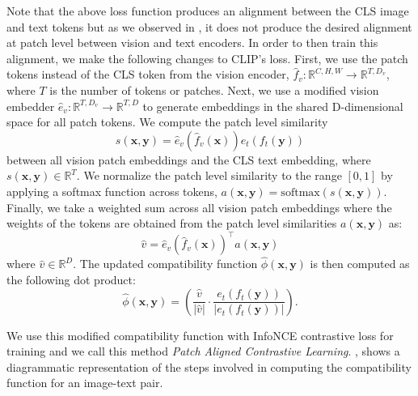 \documentclass[10pt,twocolumn,letterpaper]{article}
\begin{document}
Note that the above loss function produces an alignment between the CLS image and text tokens but as we observed in , it does not produce the desired alignment at patch level between vision and text encoders. In order to then train this alignment, we make the following changes to CLIP's loss. First, we use the patch tokens instead of the CLS token from the vision encoder, $\hat{f}_v: \mathbb{R}^{C, H, W} \rightarrow \mathbb{R}^{T, D_v}$, where $T$ is the number of tokens or patches. Next, we use a modified vision embedder $\hat{e}_v: \mathbb{R}^{T, D_v} \rightarrow \mathbb{R}^{T, D}$ to generate embeddings in the shared D-dimensional space for all patch tokens. We compute the patch level similarity
\begin{equation}
\label{eq:patch_similarity}
    s(\mathbf{x}, \mathbf{y}) = \hat{e}_v(\hat{f}_v(\mathbf{x}))e_t(f_t(\mathbf{y}))
\end{equation}
between all vision patch embeddings and the CLS text embedding, where $s(\mathbf{x}, \mathbf{y}) \in \mathbb{R}^T$. We normalize the patch level similarity to the range $[0, 1]$ by applying a softmax function across tokens, $a(\mathbf{x}, \mathbf{y}) = \mathrm{softmax}(s(\mathbf{x}, \mathbf{y}))$. Finally, we take a weighted sum across all vision patch embeddings where the weights of the tokens are obtained from the patch level similarities $a(\mathbf{x}, \mathbf{y})$ as:
\begin{equation}
    \hat{v} = \hat{e}_v(\hat{f}_v(\mathbf{x}))^\intercal a(\mathbf{x}, \mathbf{y})
\end{equation}
where $\hat{v} \in \mathbb{R}^D$. The updated compatibility function $\hat{\phi}(\mathbf{x}, \mathbf{y})$ is then computed as the following dot product:
\begin{equation}
    \hat{\phi}(\mathbf{x}, \mathbf{y}) = \left(\frac{\hat{v}}{|\hat{v}|} \cdot \frac{e_t(f_t(\mathbf{y}))}{|e_t(f_t(\mathbf{y}))|}\right). 
\end{equation}

We use this modified compatibility function with InfoNCE contrastive loss for training and we call this method \emph{Patch Aligned Contrastive Learning}. , shows a diagrammatic representation of the steps involved in computing the compatibility function for an image-text pair.
\end{document}

